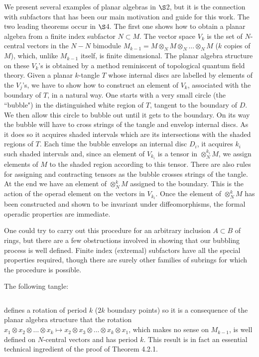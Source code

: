 We present several examples of planar algebras in
$\S$2, but it is the connection with subfactors
that has been our main motivation and guide for
this work. The two leading theorems occur in
$\S$4. The first one shows how to obtain a planar
algebra from  a finite index subfactor $N\subset
M$. The vector space $V_k$ is the set of
$N$-central vectors in the $N-N$ bimodule
$M_{k-1}=M\otimes_N M\otimes_N\dots\otimes_N M$
($k$ copies of $M$), which, unlike $M_{k-1}$
itself, is finite dimensional. The planar algebra
structure on these $V_k$'s is obtained by a method
reminiscent of topological quantum field theory.
Given a planar  $k$-tangle $T$ whose internal
discs are labelled by elements of the $V_j$'s, we
have to show how to construct an element of $V_k$,
associated with the boundary of $T$, in a natural
way. One starts with a very small circle (the
``bubble") in the distinguished white region of
$T$, tangent to the boundary of $D$. We then allow
this circle to bubble out until it gets to the
boundary. On its way the bubble will have to cross
strings of the tangle and envelop internal discs.
As it does so it acquires shaded intervals which
are its intersections  with the shaded regions of
$T$. Each time the bubble envelops an internal
disc $D_i$, it acquires $k_i$ such shaded
intervals and, since an element of $V_{k_i}$ is a
tensor in $\otimes^{k_i}_N M$, we assign elements
of $M$ to the shaded region according to this
tensor.  There are also rules for assigning and
contracting tensors as the bubble crosses strings
of the tangle. At the end we have an element of
$\otimes^k_N M$ assigned to the boundary. This is
the action of the operad element on the vectors in
$V_{k_i}$. Once the element of $\otimes^k_N M$ has
been constructed and shown to be invariant under
diffeomorphisms, the formal operadic properties
are immediate.

One could try to carry out this procedure for an
arbitrary inclusion $A\subset B$ of rings, but
there are a few obstructions involved in showing
that our bubbling process is well defined. Finite
index (extremal) subfactors have all the special
properties required, though there are surely other
families of subrings for which the procedure is
possible.

The following tangle:

\[
	
\]

\noindent defines a rotation of period $k$ ($2k$
boundary points) so it is a consequence of the
planar algebra structure that the rotation
$x_1\otimes x_2\otimes\dots\otimes x_k\mapsto
x_2\otimes x_3\otimes\dots\otimes x_k\otimes x_1$,
which makes no sense on $M_{k-1}$, is well defined
on $N$-central vectors and has period $k$. This
result is in fact an essential technical
ingredient of the proof of Theorem 4.2.1.

